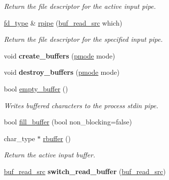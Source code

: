 \begin{DoxyCompactItemize}
\begin{DoxyCompactList}\small\item\em Return the file descriptor for the active input pipe. \end{DoxyCompactList}\item 
\mbox{\hyperlink{structredi_1_1pstreams_add0b7eaed16eb6c22a56012958d85b1d}{fd\+\_\+type}} \& \mbox{\hyperlink{classredi_1_1basic__pstreambuf_a0b9241b9835a5978a0b9b183c8f2ed81}{rpipe}} (\mbox{\hyperlink{classredi_1_1basic__pstreambuf_a8a3f6a830b6035ed755188e32ffffadc}{buf\+\_\+read\+\_\+src}} which)
\begin{DoxyCompactList}\small\item\em Return the file descriptor for the specified input pipe. \end{DoxyCompactList}\item 
\mbox{\label{classredi_1_1basic__pstreambuf_a2761951761f2ef2b947d79d1609e90df}} 
void {\bfseries create\+\_\+buffers} (\mbox{\hyperlink{structredi_1_1pstreams_a1eae4aad88812af03a0fbb3ec13c50b7}{pmode}} mode)
\item 
\mbox{\label{classredi_1_1basic__pstreambuf_a6e338a431ee8c94cbf8d4399c875c258}} 
void {\bfseries destroy\+\_\+buffers} (\mbox{\hyperlink{structredi_1_1pstreams_a1eae4aad88812af03a0fbb3ec13c50b7}{pmode}} mode)
\item 
bool \mbox{\hyperlink{classredi_1_1basic__pstreambuf_aa9d2bb07c6d563cbf9886d69fa42523e}{empty\+\_\+buffer}} ()
\begin{DoxyCompactList}\small\item\em Writes buffered characters to the process\textquotesingle{} stdin pipe. \end{DoxyCompactList}\item 
bool \mbox{\hyperlink{classredi_1_1basic__pstreambuf_ac84fcdc04e6d81fc1118b21c4ba6e5b2}{fill\+\_\+buffer}} (bool non\+\_\+blocking=false)
\item 
char\+\_\+type $\ast$ \mbox{\hyperlink{classredi_1_1basic__pstreambuf_abd8e9fd297080561faf0f74c538cf12d}{rbuffer}} ()
\begin{DoxyCompactList}\small\item\em Return the active input buffer. \end{DoxyCompactList}\item 
\mbox{\label{classredi_1_1basic__pstreambuf_a66875e53c746460d7357e1427de9dd0e}} 
\mbox{\hyperlink{classredi_1_1basic__pstreambuf_a8a3f6a830b6035ed755188e32ffffadc}{buf\+\_\+read\+\_\+src}} {\bfseries switch\+\_\+read\+\_\+buffer} (\mbox{\hyperlink{classredi_1_1basic__pstreambuf_a8a3f6a830b6035ed755188e32ffffadc}{buf\+\_\+read\+\_\+src}})
\end{DoxyCompactItemize}
